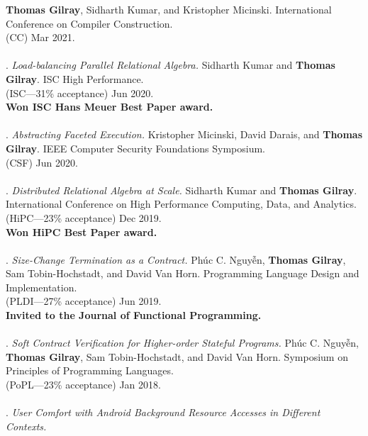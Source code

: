 \textbf{Thomas Gilray}, Sidharth Kumar, and Kristopher Micinski.
International Conference on Compiler Construction.
\\(CC) Mar 2021. 
\\ \vspace{-0.1cm}\\
\paper. \textit{Load-balancing Parallel Relational Algebra.}
Sidharth Kumar and \textbf{Thomas Gilray}.
ISC High Performance.
\\(ISC---31\% acceptance) Jun 2020. 
\\\textbf{Won ISC Hans Meuer Best Paper award.} \\ \vspace{-0.1cm}\\
\paper. \textit{Abstracting Faceted Execution.}
Kristopher Micinski, David Darais, and \textbf{Thomas Gilray}.
IEEE Computer Security Foundations Symposium.
\\(CSF) Jun 2020. 
\\ \vspace{-0.1cm}\\
\paper. \textit{Distributed Relational Algebra at Scale.}
Sidharth Kumar and \textbf{Thomas Gilray}.
International Conference on High Performance Computing, Data, and Analytics.
\\(HiPC---23\% acceptance) Dec 2019. 
\\\textbf{Won HiPC Best Paper award.} \\ \vspace{-0.1cm}\\
\paper. \textit{Size-Change Termination as a Contract.}
Phúc C. Nguyễn, \textbf{Thomas Gilray}, Sam Tobin-Hochstadt, and David Van Horn.
Programming Language Design and Implementation.
\\(PLDI---27\% acceptance) Jun 2019. 
\\\textbf{Invited to the Journal of Functional Programming.} \\ \vspace{-0.1cm}\\
\paper. \textit{Soft Contract Verification for Higher-order Stateful Programs.}
Phúc C. Nguyễn, \textbf{Thomas Gilray}, Sam Tobin-Hochstadt, and David Van Horn.
Symposium on Principles of Programming Languages.
\\(PoPL---23\% acceptance) Jan 2018. 
\\ \vspace{-0.1cm}\\
\paper. \textit{User Comfort with Android Background Resource Accesses in Different Contexts.}
